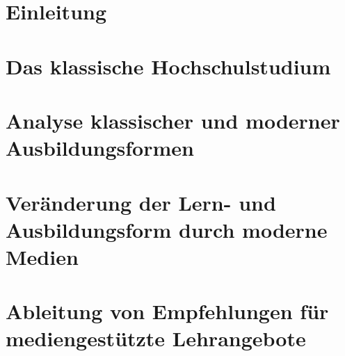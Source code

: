 \documentclass[150]{HSMW-Thesis}
\begin{document}
\begin{Referat}
\end{Referat}

\begin{Vorwort}
\end{Vorwort}

\Hauptteil

\chapter{Einleitung}

\chapter{Das klassische Hochschulstudium}

\chapter{Analyse klassischer und moderner Ausbildungsformen}

\chapter{Veränderung der Lern- und Ausbildungsform durch moderne Medien}

\chapter{Ableitung von Empfehlungen für mediengestützte Lehrangebote}


\Anhang


\begin{thebibliography}{99}
\bibitem{} 
\end{thebibliography}
\end{document}
